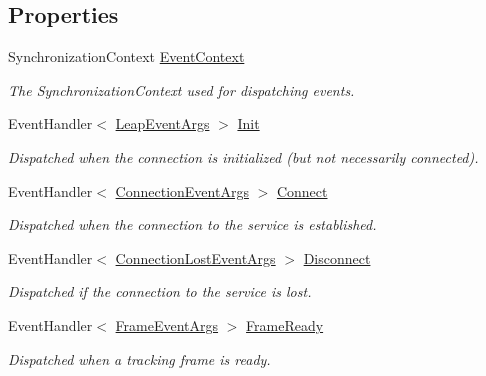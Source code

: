 \subsection*{Properties}
\begin{DoxyCompactItemize}
\item 
Synchronization\+Context \mbox{\hyperlink{class_leap_1_1_controller_afa47e4254ee6d9fa05ba485593b05e4e}{Event\+Context}}
\begin{DoxyCompactList}\small\item\em The Synchronization\+Context used for dispatching events. \end{DoxyCompactList}\item 
Event\+Handler$<$ \mbox{\hyperlink{class_leap_1_1_leap_event_args}{Leap\+Event\+Args}} $>$ \mbox{\hyperlink{class_leap_1_1_controller_aeabfa1a25d7aa3724cb786885195e0b2}{Init}}
\begin{DoxyCompactList}\small\item\em Dispatched when the connection is initialized (but not necessarily connected). \end{DoxyCompactList}\item 
Event\+Handler$<$ \mbox{\hyperlink{class_leap_1_1_connection_event_args}{Connection\+Event\+Args}} $>$ \mbox{\hyperlink{class_leap_1_1_controller_abc23a30fb9ef4327ab4c12dc90698f14}{Connect}}
\begin{DoxyCompactList}\small\item\em Dispatched when the connection to the service is established. \end{DoxyCompactList}\item 
Event\+Handler$<$ \mbox{\hyperlink{class_leap_1_1_connection_lost_event_args}{Connection\+Lost\+Event\+Args}} $>$ \mbox{\hyperlink{class_leap_1_1_controller_ac627061e99531a03874428bebc5f1111}{Disconnect}}
\begin{DoxyCompactList}\small\item\em Dispatched if the connection to the service is lost. \end{DoxyCompactList}\item 
Event\+Handler$<$ \mbox{\hyperlink{class_leap_1_1_frame_event_args}{Frame\+Event\+Args}} $>$ \mbox{\hyperlink{class_leap_1_1_controller_af401a79284cacb70afa71d0b109143fe}{Frame\+Ready}}
\begin{DoxyCompactList}\small\item\em Dispatched when a tracking frame is ready. \end{DoxyCompactList}\item 

\end{DoxyCompactItemize}
